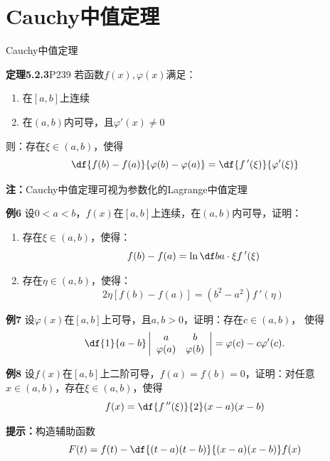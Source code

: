 \section{Cauchy中值定理}

\begin{frame}{Cauchy中值定理}
	\linespread{1.2}\pause 
	\begin{block}{{\bf 定理5.2.3}\hfill P239}
		若函数$f(x),\varphi(x)$满足：\pause 
		\begin{enumerate}
		  \item 在$[a,b]$上连续\pause 
		  \item 在$(a,b)$内可导，且$\varphi'(x)\ne 0$\pause 
		\end{enumerate}
		则：存在$\xi\in(a,b)$，\pause 使得
		$$\df{f(b)-f(a)}{\varphi(b)-\varphi(a)}=\df{f\,'(\xi)}{\varphi'(\xi)}$$
	\end{block}
	\pause
	{\bf 注：}Cauchy中值定理可视为参数化的Lagrange中值定理
\end{frame}

\begin{frame}
	\linespread{1.2}
	\begin{exampleblock}{{\bf 例6}\hfill}
		设$0<a<b$，$f(x)$在$[a,b]$上连续，在$(a,b)$内可导，证明：
		\begin{enumerate}
		  \item 存在$\xi\in(a,b)$，使得：
			$$f(b)-f(a)=\ln\df ba\cdot \xi f\,'(\xi)$$
		  \pause\vspace{-1em}
		  \item 存在$\eta\in(a,b)$，使得：
		    $$2\eta[f(b)-f(a)]=(b^2-a^2)f\,'(\eta)$$
		\end{enumerate}
	\end{exampleblock}
\end{frame}

\begin{frame}
	\linespread{1.2}
	\begin{exampleblock}{{\bf 例7}\hfill}
		设$\varphi(x)$在$[a,b]$上可导，且$a,b>0$，证明：存在$c\in(a,b)$，
		使得
		$$\df{1}{a-b}\left|\begin{array}{cc}
		a & b\\ \varphi(a) & \varphi(b)
		\end{array}\right|=\varphi(c)-c\varphi'(c).$$
	\end{exampleblock}
\end{frame}

\begin{frame}
	\linespread{1.2}
	\begin{exampleblock}{{\bf 例8}\hfill}
		设$f(x)$在$[a,b]$上二阶可导，$f(a)=f(b)=0$，证明：对任意
		$x\in(a,b)$，存在$\xi\in(a,b)$，使得
		$$f(x)=\df{f\,''(\xi)}{2}(x-a)(x-b)$$
	\end{exampleblock}
	\pause
	{\bf 提示：}构造辅助函数
	$$F(t)=f(t)-\df{(t-a)(t-b)}{(x-a)(x-b)}f(x)$$
\end{frame}

